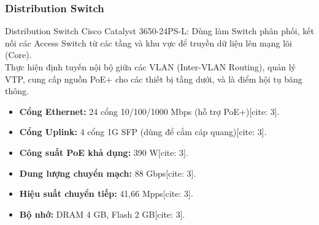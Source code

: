 \subsubsection{Distribution Switch}
Distribution Switch Cisco Catalyst 3650-24PS-L: Dùng làm Switch phân phối, kết nối các Access Switch từ các tầng và khu vực để truyền dữ liệu lên mạng lõi (Core).\\
\indent Thực hiện định tuyến nội bộ giữa các VLAN (Inter-VLAN Routing), quản lý VTP, cung cấp nguồn PoE+ cho các thiết bị tầng dưới, và là điểm hội tụ băng thông.

\begin{tcolorbox}[
        enhanced,
        colback=white,
        colframe=darkgray,
        coltitle=black,
        fonttitle=\large\bfseries,
        title=Thông số kỹ thuật Cisco Catalyst 3650-24PS-L,
        attach boxed title to top left={xshift=5mm, yshift=-3mm},
        boxed title style={colback=white, colframe=darkgray},
        drop fuzzy shadow,
        top=4mm, bottom=2mm, left=2mm, right=2mm
    ]
        \begin{itemize}
            \item \textbf{Cổng Ethernet:} 24 cổng 10/100/1000 Mbps (hỗ trợ PoE+)[cite: 3].
            \item \textbf{Cổng Uplink:} 4 cổng 1G SFP (dùng để cắm cáp quang)[cite: 3].
            \item \textbf{Công suất PoE khả dụng:} 390 W[cite: 3].
            \item \textbf{Dung lượng chuyển mạch:} 88 Gbps[cite: 3].
            \item \textbf{Hiệu suất chuyển tiếp:} 41,66 Mpps[cite: 3].
            \item \textbf{Bộ nhớ:} DRAM 4 GB, Flash 2 GB[cite: 3].
        \end{itemize}
    \end{tcolorbox}
